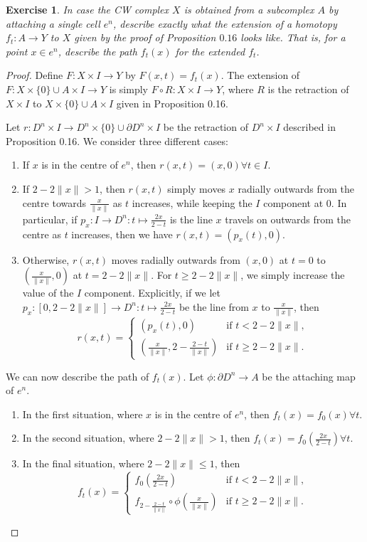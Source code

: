 \documentclass{article}
\newtheorem{exercise}{Exercise}[subsection]
\begin{document}
\begin{exercise}
In case the CW complex $X$ is obtained from a subcomplex $A$ by attaching a single cell $e^n$, describe exactly what the extension of a homotopy $f_t:A\to Y$ to $X$ given by the proof of Proposition $0.16$ looks like. That is, for a point $x\in e^n$, describe the path $f_t(x)$ for the extended $f_t$.
\end{exercise}
\begin{proof}
Define $F:X\times I\to Y$ by $F(x,t)=f_t(x)$. The extension of $F:X\times\{0\}\cup A\times I\to Y$ is simply $F\circ R:X\times I\to Y$, where $R$ is the retraction of $X\times I$ to $X\times\{0\}\cup A\times I$ given in Proposition 0.16.

Let $r:D^n\times I\to D^n\times\{0\}\cup \partial D^n\times I$ be the retraction of $D^n\times I$ described in Proposition 0.16. 
We consider three different cases:
\begin{enumerate}
\item If $x$ is in the centre of $e^n$, then $r(x,t)=(x,0)\forall t\in I$. 
\item If $2-2\|x\|> 1$, then $r(x,t)$ simply moves $x$ radially outwards from the centre towards $\frac{x}{\|x\|}$ as $t$ increases, while keeping the $I$ component at $0$. In particular, if $p_x:I\to D^n:t\mapsto\frac{2x}{2-t}$ is the line $x$ travels on outwards from the centre as $t$ increases, then we have $r(x,t)=(p_x(t),0)$.
\item Otherwise,  $r(x,t)$ moves radially outwards from $(x,0)$ at $t=0$ to $\left(\frac{x}{\|x\|},0\right)$ at $t=2-2\|x\|$. For $t\geq2-2\|x\|$, we simply increase the value of the $I$ component. Explicitly, if we let $p_x:[0,2-2\|x\|]\to D^n:t\mapsto\frac{2x}{2-t}$ be the line from $x$ to $\frac{x}{\|x\|}$, then\[r(x,t)=\begin{cases}
    (p_x(t),0)&\text{if }t< 2-2\|x\|,\\
    \left(\frac{x}{\|x\|},2-\frac{2-t}{\|x\|}\right)&\text{if }t\geq2-2\|x\|.
\end{cases}\]
\end{enumerate}
We can now describe the path of $f_t(x)$. Let $\phi:\partial D^n\to A$ be the attaching map of $e^n$.
\begin{enumerate}
\item In the first situation, where $x$ is in the centre of $e^n$, then $f_t(x)=f_0(x)\forall t$.
\item In the second situation, where $2-2\|x\|> 1$, then $f_t(x)=f_0\left(\frac{2x}{2-t}\right)\forall t$.
\item In the final situation, where $2-2\|x\|\leq 1$, then\[f_t(x)=\begin{cases}
    f_0\left(\frac{2x}{2-t}\right)&\text{if }t<2-2\|x\|,\\
    f_{2-\frac{2-t}{\|x\|}}\circ\phi\left(\frac{x}{\|x\|}\right)&\text{if }t\geq 2-2\|x\|.
\end{cases}\]
\end{enumerate}
\end{proof}
\end{document}
